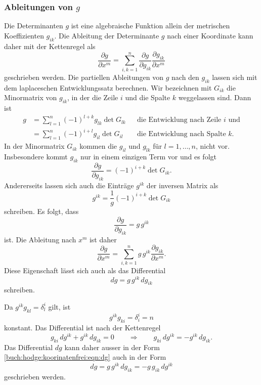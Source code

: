 \subsubsection{Ableitungen von $g$}
Die Determinanten $g$ ist eine algebraische Funktion allein der 
metrischen Koeffizienten $g_{ik}$.
Die Ableitung der Determinante $g$ nach einer Koordinate kann daher
mit der Kettenregel als
\begin{equation*}
\frac{\partial g}{\partial x^m}
=
\sum_{i,k=1}^n
\frac{\partial g}{\partial g_{ik}}
\frac{\partial g_{ik}}{\partial x^m}
\end{equation*}
geschrieben werden.
Die partiellen Ableitungen von $g$ nach den $g_{ik}$ lassen sich
mit dem laplaceschen Entwicklungssatz berechnen.
Wir bezeichnen mit $G_{ik}$ die Minormatrix von $g_{ik}$, in der
die Zeile $i$ und die Spalte $k$ weggelassen sind.
Dann ist 
\begin{align*}
g
&=
\sum_{l=1}^n (-1)^{l+k} g_{lk} \det G_{lk}
&&\text{die Entwicklung nach Zeile $i$ und}
\\
&=
\sum_{l=1}^n (-1)^{i+l} g_{il} \det G_{il}
&&\text{die Entwicklung nach Spalte $k$.}
\end{align*}
In der Minormatrix $G_{ik}$ kommen die $g_{il}$ und $g_{lk}$ für
$l=1,\dots,n$, nicht vor.
Insbesondere kommt $g_{ik}$ nur in einem einzigen Term vor und es
folgt
\[
\frac{\partial g}{\partial g_{ik}}
=
(-1)^{i+k}
\det G_{ik}.
\]
Andererseits lassen sich auch die Einträge $g^{ik}$ der inversen
Matrix als
\[
g^{ik} = \frac{1}{g} (-1)^{i+k} \det G_{ik}
\]
schreiben.
Es folgt, dass
\[
\frac{\partial g}{\partial g_{ik}}
=
g\, g^{ik}
\]
ist.
Die Ableitung nach $x^m$ ist daher
\[
\frac{\partial g}{\partial x^m}
=
\sum_{i,k=1}^n g\,g^{ik} \frac{\partial g_{ik}}{\partial x^m}.
\]
Diese Eigenschaft lässt sich auch als das Differential
\begin{equation}
dg
=
g\,g^{ik}\,dg_{ik}
\label{buch:hodge:koorinatenfrei:eqn:dg}
\end{equation}
schreiben.

Da $g^{ik}g_{kl}=\delta^i_l$ gilt, ist
\[
g^{ik}g_{ki} = \delta^i_i = n
\]
konstant.
Das Differential ist nach der Kettenregel
\[
g_{ki}\,dg^{ik}
+
g^{ik}\,dg_{ik}
=
0
\qquad\Rightarrow\qquad
g_{ki}\,dg^{ik}
=
-
g^{ik}\,dg_{ik}.
\]
Das Differential $dg$ kann daher ausser in der Form
\eqref{buch:hodge:koorinatenfrei:eqn:dg}
auch in der Form
\begin{equation}
dg
=
g\,g^{ik}\,dg_{ik}
=
-
g\,g_{ik}\,dg^{ik}
\label{buch:hodge:koorinatenfrei:eqn:dg2}
\end{equation}
geschrieben werden.

